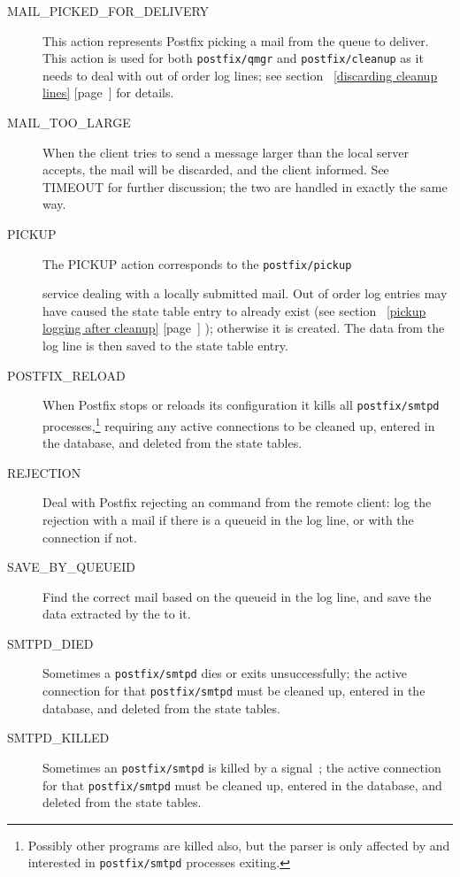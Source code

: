 \documentclass[a4paper,12pt,draft]{article}
\newcommand{\refwithpage}[1]{%
    \empty{}\ref{#1} [page~\pageref{#1}]%
}
\newcommand{\daemon}[1]{%
    \texttt{postfix/#1}%
}
\begin{document}
\begin{description}
    \item [MAIL\_PICKED\_FOR\_DELIVERY] This action represents Postfix
        picking a mail from the queue to deliver. This action is used for
        both \daemon{qmgr} and \daemon{cleanup} as it needs to deal with
        out of order log lines; see section~\refwithpage{discarding cleanup
        lines} for details.

    \item [MAIL\_TOO\_LARGE] When the client tries to send a message larger
        than the local server accepts, the mail will be discarded, and the
        client informed.  See TIMEOUT for further discussion; the two are
        handled in exactly the same way.

    \item [PICKUP] The PICKUP action corresponds to the \daemon{pickup}
        service dealing with a locally submitted mail.  Out of order log
        entries may have caused the state table entry to already exist (see
        section~\refwithpage{pickup logging after cleanup}); otherwise it
        is created.  The data from the log line is then saved to the state
        table entry.

    \item [POSTFIX\_RELOAD] When Postfix stops or reloads its configuration
        it kills all \daemon{smtpd} processes,\footnote{Possibly other
        programs are killed also, but the parser is only affected by and
        interested in \daemon{smtpd} processes exiting.} requiring any
        active connections to be cleaned up, entered in the database, and
        deleted from the state tables.

    \item [REJECTION] Deal with Postfix rejecting an \SMTP{} command from
        the remote client: log the rejection with a mail if there is a
        queueid in the log line, or with the connection if not.

    \item [SAVE\_BY\_QUEUEID] Find the correct mail based on the queueid in
        the log line, and save the data extracted by the \regex{} to it.

    \item [SMTPD\_DIED] Sometimes a \daemon{smtpd} dies or exits
        unsuccessfully; the active connection for that \daemon{smtpd} must
        be cleaned up, entered in the database, and deleted from the state
        tables.

    \item [SMTPD\_KILLED] Sometimes an \daemon{smtpd} is killed by a
        signal~\cite{Wikipedia-unix-signals}; the active connection for
        that \daemon{smtpd} must be cleaned up, entered in the database,
        and deleted from the state tables.


\end{description}
\end{document}
